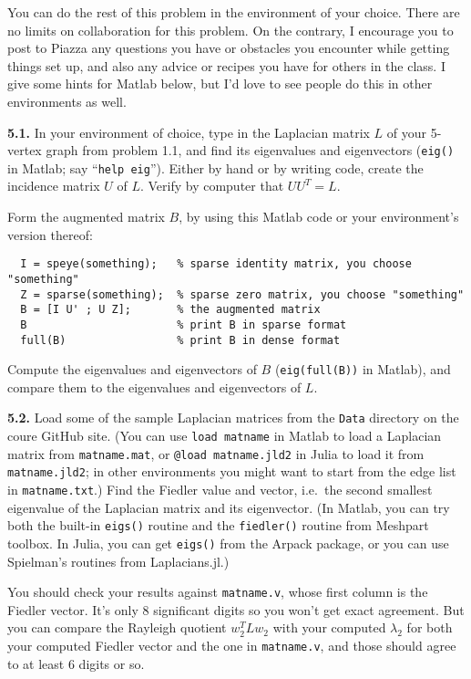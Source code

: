 \documentclass[11pt]{article}
\begin{document}
You can do the rest of this problem in the environment of your choice.
There are no limits on collaboration for this problem. 
On the contrary, I encourage you to post to Piazza any
questions you have or obstacles you encounter while getting things 
set up, and also any advice or recipes you have for others in the class.
I give some hints for Matlab below, 
but I'd love to see people do this in other environments as well.

\par\bigskip
{\bf 5.1.} 
In your environment of choice, 
type in the Laplacian matrix $L$ of your 5-vertex graph from problem 1.1,
and find its eigenvalues and eigenvectors
({\tt eig()} in Matlab; say ``{\tt help eig}'').
Either by hand or by writing code, create the incidence
matrix $U$ of $L$.  Verify by computer that $UU^T = L$.
\par
Form the augmented matrix $B$, 
by using this Matlab code or your environment's version thereof:
\begin{verbatim}
  I = speye(something);   % sparse identity matrix, you choose "something"
  Z = sparse(something);  % sparse zero matrix, you choose "something"
  B = [I U' ; U Z];       % the augmented matrix
  B                       % print B in sparse format
  full(B)                 % print B in dense format
\end{verbatim}
Compute the eigenvalues and eigenvectors of $B$ 
({\tt eig(full(B))} in Matlab),
and compare them to the eigenvalues and eigenvectors of $L$.

\par\bigskip
{\bf 5.2.} 
Load some of the sample Laplacian matrices from
the {\tt Data} directory on the coure GitHub site.
(You can use {\tt load matname} in Matlab to load 
a Laplacian matrix from {\tt matname.mat},
or {\tt @load matname.jld2} in Julia to load it from {\tt matname.jld2};
in other environments you might want to start from the edge list
in {\tt matname.txt}.)
Find the Fiedler value and vector, i.e.\ the second smallest eigenvalue 
of the Laplacian matrix and its eigenvector.
(In Matlab, you can try both the built-in {\tt eigs()} routine and 
the {\tt fiedler()} routine from Meshpart toolbox.
In Julia, you can get {\tt eigs()} from the Arpack package,
or you can use Spielman's routines from Laplacians.jl.)

You should check your results against {\tt matname.v}, 
whose first column is the Fiedler vector. 
It's only 8 significant digits so you won't get exact agreement.
But you can compare the Rayleigh quotient $w_2^TLw_2$ with your 
computed $\lambda_2$ for both your computed Fiedler vector and the 
one in {\tt matname.v}, and those should agree to at least 6 digits or so.
\end{document}
